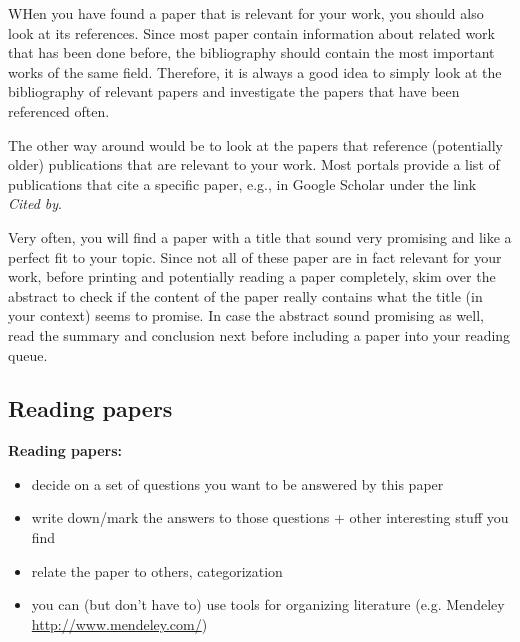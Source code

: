\documentclass{article}
\begin{document}
WHen you have found a paper that is relevant for your work, you should also look at its references.
Since most paper contain information about related work that has been done before, the bibliography should contain the most important works of the same field.
Therefore, it is always a good idea to simply look at the bibliography of relevant papers and investigate the papers that have been referenced often.

The other way around would be to look at the papers that reference (potentially older) publications that are relevant to your work.
Most portals provide a list of publications that cite a specific paper, e.g., in Google Scholar under the link \emph{Cited by}.

Very often, you will find a paper with a title that sound very promising and like a perfect fit to your topic.
Since not all of these paper are in fact relevant for your work, before printing and potentially reading a paper completely, skim over the abstract to check if the content of the paper really contains what the title (in your context) seems to promise.
In case the abstract sound promising as well, read the summary and conclusion next before including a paper into your reading queue.



\subsection{Reading papers}


\textbf{Reading papers: }
\begin{itemize}
\item decide on a set of questions you want to be answered by this paper
\item write down/mark the answers to those questions + other interesting stuff you find
\item relate the paper to others, categorization 
\item you can (but don't have to) use tools for organizing literature (e.g. Mendeley \url{http://www.mendeley.com/}) 
\end{itemize}
\end{document}
